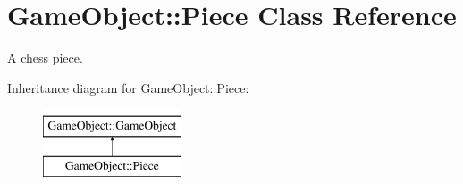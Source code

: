 \hypertarget{classGameObject_1_1Piece}{
\section{GameObject::Piece Class Reference}
\label{classGameObject_1_1Piece}
}


A chess piece.  


Inheritance diagram for GameObject::Piece:\begin{figure}[H]
\begin{center}
\leavevmode
\includegraphics[height=2.000000cm]{classGameObject_1_1Piece}
\end{center}
\end{figure}
